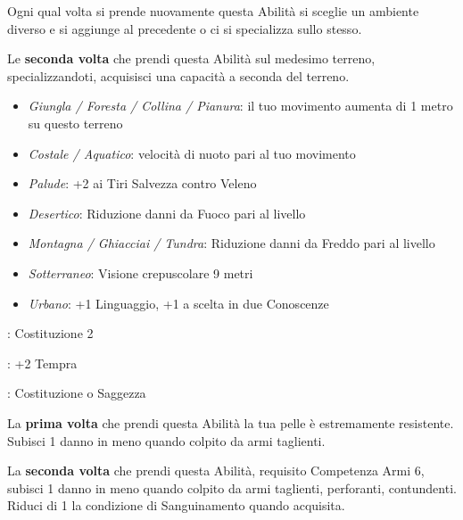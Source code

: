 \begin{multicols}{2}
\medskip

Ogni qual volta si prende nuovamente questa Abilità si sceglie un ambiente diverso e si aggiunge al precedente o ci si specializza sullo stesso.

Le \textbf{seconda volta} che prendi questa Abilità sul medesimo terreno, specializzandoti, acquisisci una capacità a seconda del terreno.

\begin{itemize}[leftmargin=*] \setlength{\itemsep}{0pt}

\item \emph{Giungla / Foresta / Collina / Pianura}: il tuo movimento aumenta di 1 metro su questo terreno

\item \emph{Costale / Aquatico}: velocità di nuoto pari al tuo movimento

\item \emph{Palude}: +2 ai Tiri Salvezza contro Veleno

\item \emph{Desertico}: Riduzione danni da Fuoco pari al livello

\item \emph{Montagna / Ghiacciai / Tundra}: Riduzione danni da Freddo pari al livello

\item \emph{Sotterraneo}: Visione crepuscolare 9 metri

\item \emph{Urbano}: +1 Linguaggio, +1 a scelta in due Conoscenze

\end{itemize}

\begin{description}[noitemsep, topsep=0pt, parsep=0pt, partopsep=0pt, leftmargin=0cm, labelwidth=2.5cm]
    \item[\textbf{Requisito}]: Costituzione 2
    \item[\textbf{Tiri Salvezza}]: +2 Tempra
    \item[\textbf{Caratteristica}]: Costituzione o Saggezza
\end{description}

La \textbf{prima volta} che prendi questa Abilità la tua pelle è estremamente resistente. Subisci 1 danno in meno quando colpito da armi taglienti.

La \textbf{seconda volta} che prendi questa Abilità, requisito Competenza Armi 6, subisci 1 danno in meno quando colpito da armi taglienti, perforanti, contundenti. Riduci di 1 la condizione di Sanguinamento quando acquisita.


\end{multicols}
